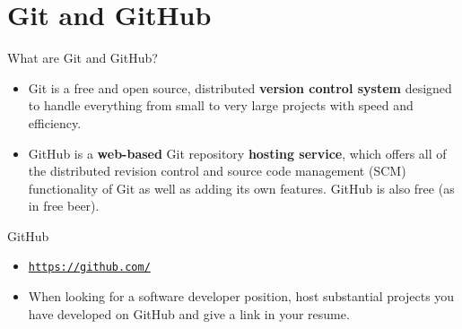 \documentclass[aspectratio=169,11pt,t]{beamer}
\newcommand{\hl}[1]{\textcolor{accent}{#1}}              %
\newcommand{\link}[1]{\textcolor{linkcol}{\underline{\texttt{#1}}}}
\newcommand{\dividerslide}[1]{%
  \begin{frame}[c]
    \centering{\LARGE\color{accent}#1\par}
  \end{frame}}
\begin{document}
\section{Git and GitHub}
\dividerslide{Git and GitHub}

\begin{frame}{What are Git and GitHub?}
  \vskip3mm
  \begin{itemize}
    \item \hl{Git} is a \hl{free} and \hl{open source}, \hl{distributed} \textbf{version control system}
          designed to handle everything from small to very large projects with speed and efficiency.
    \item \hl{GitHub} is a \textbf{web-based} Git repository \textbf{\hl{hosting service}}, which offers
          all of the distributed revision control and \hl{source code management} (\hl{SCM})
          functionality of Git as well as adding its own features. GitHub is also free (as in free beer).
  \end{itemize}
\end{frame}

\begin{frame}{GitHub}
  \vskip3mm
  \begin{itemize}
    \item \link{https://github.com/}
    \item When looking for a software developer position, host substantial projects you have
          developed on GitHub and give a link in your resume.
  \end{itemize}
\end{frame}
\end{document}
